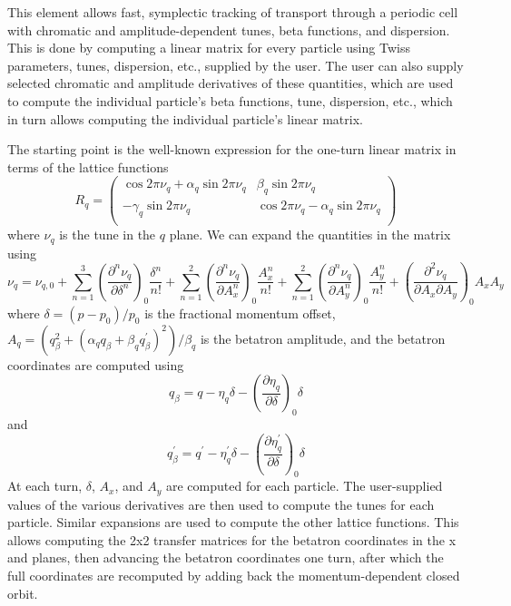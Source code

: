 This element allows fast, symplectic tracking of transport through a
periodic cell with chromatic and amplitude-dependent tunes, beta
functions, and dispersion.  This is done by computing a linear matrix
for every particle using Twiss
parameters, tunes, dispersion, etc., supplied by the user.  The user
can also supply selected chromatic and amplitude derivatives of these
quantities, which are used to compute the individual particle's beta
functions, tune, dispersion, etc., which in turn allows computing the
individual particle's linear matrix.

The starting point is the well-known expression for the one-turn linear matrix
in terms of the lattice functions
\begin{equation}
R_q = 
\left(\begin{array}{cccc}
\cos 2\pi\nu_q + \alpha_q \sin 2\pi\nu_q & \beta_q \sin 2\pi\nu_q \\
-\gamma_q \sin 2\pi\nu_q                 & \cos 2\pi\nu_q - \alpha_q \sin 2\pi\nu_q     \\
\end{array}\right)
\end{equation}
where $\nu_q$ is the tune in the $q$ plane. We can expand the quantities in the matrix using
\begin{equation}
\nu_q = \nu_{q,0} + \sum_{n=1}^3 \left(\frac{\partial^n \nu_q}{\partial\delta^n}\right)_0\frac{\delta^n}{n!} + 
\sum_{n=1}^2 \left(\frac{\partial^n\nu_q}{\partial A_x^n}\right)_0 \frac{A_x^n}{n!} +
\sum_{n=1}^2 \left(\frac{\partial^n\nu_q}{\partial A_y^n}\right)_0 \frac{A_y^n}{n!} +
\left(\frac{\partial^2 \nu_q}{\partial A_x\partial A_y}\right)_0 A_x A_y
\end{equation}
where $\delta = (p-p_0)/p_0$ is the fractional momentum offset,
$A_q = (q_\beta^2 + (\alpha_q q_\beta + \beta_q q^\prime_\beta)^2)/\beta_q$ is
the betatron amplitude, and the betatron coordinates are computed using
\begin{equation}
q_\beta = q - \eta_q\delta - \left(\frac{\partial \eta_q}{\partial \delta}\right)_0 \delta
\end{equation}
and
\begin{equation}
q^\prime_\beta = q^\prime - \eta^\prime_q\delta - \left(\frac{\partial \eta^\prime_q}{\partial \delta}\right)_0 \delta
\end{equation}
At each turn, $\delta$, $A_x$, and $A_y$ are computed for each particle.
The user-supplied values of the various derivatives are then used to 
compute the tunes for each particle.
Similar expansions are used to compute the other lattice functions.
This allows computing the 2x2 transfer matrices for the betatron coordinates in the 
x and planes, then advancing the
betatron coordinates one turn, after which the full coordinates are recomputed by adding back the
momentum-dependent closed orbit.

